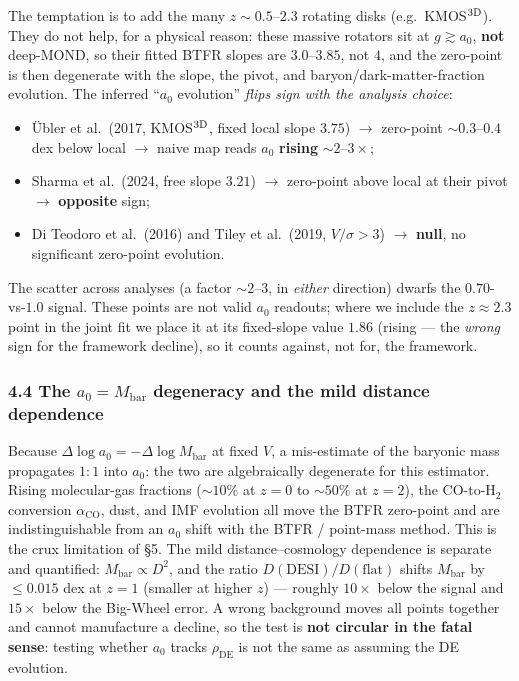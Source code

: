 \documentclass[
]{article}
\providecommand{\tightlist}{%
  \setlength{\itemsep}{0pt}\setlength{\parskip}{0pt}}
\begin{document}
The temptation is to add the many \(z\sim0.5\)--\(2.3\) rotating disks
(e.g.~KMOS\(^{3\rm D}\)). They do not help, for a physical reason: these
massive rotators sit at \(g\gtrsim a_0\), \textbf{not} deep-MOND, so
their fitted BTFR slopes are \(3.0\)--\(3.85\), not \(4\), and the
zero-point is then degenerate with the slope, the pivot, and
baryon/dark-matter-fraction evolution. The inferred ``\(a_0\)
evolution'' \emph{flips sign with the analysis choice}:

\begin{itemize}
\tightlist
\item
  Übler et al.~(2017, KMOS\(^{3\rm D}\), fixed local slope \(3.75\))
  \(\to\) zero-point \(\sim0.3\)--\(0.4\) dex below local \(\to\) naive
  map reads \(a_0\) \textbf{rising} \(\sim2\)--\(3\times\);
\item
  Sharma et al.~(2024, free slope \(3.21\)) \(\to\) zero-point above
  local at their pivot \(\to\) \textbf{opposite} sign;
\item
  Di Teodoro et al.~(2016) and Tiley et al.~(2019, \(V/\sigma>3\))
  \(\to\) \textbf{null}, no significant zero-point evolution.
\end{itemize}

The scatter across analyses (a factor \(\sim2\)--\(3\), in \emph{either}
direction) dwarfs the \(0.70\)-vs-\(1.0\) signal. These points are not
valid \(a_0\) readouts; where we include the \(z\approx2.3\) point in
the joint fit we place it at its fixed-slope value \(1.86\) (rising ---
the \emph{wrong} sign for the framework decline), so it counts against,
not for, the framework.

\subsubsection{\texorpdfstring{4.4 The \(a_0=M_\mathrm{bar}\) degeneracy
and the mild distance
dependence}{4.4 The a\_0=M\_\{\textbackslash rm bar\} degeneracy and the mild distance dependence}}\label{the-a_0m_rm-bar-degeneracy-and-the-mild-distance-dependence}

Because \(\Delta\log a_0=-\Delta\log M_\mathrm{bar}\) at fixed \(V\), a
mis-estimate of the baryonic mass propagates \(1{:}1\) into \(a_0\): the
two are algebraically degenerate for this estimator. Rising
molecular-gas fractions (\(\sim10\%\) at \(z=0\) to \(\sim50\%\) at
\(z=2\)), the CO-to-H\(_2\) conversion \(\alpha_\mathrm{CO}\), dust, and
IMF evolution all move the BTFR zero-point and are indistinguishable
from an \(a_0\) shift with the BTFR / point-mass method. This is the
crux limitation of §5. The mild distance--cosmology dependence is
separate and quantified: \(M_\mathrm{bar}\propto D^2\), and the ratio
\(D(\text{DESI})/D(\text{flat})\) shifts \(M_\mathrm{bar}\) by \(\le0.015\)
dex at \(z=1\) (smaller at higher \(z\)) --- roughly \(10\times\) below
the signal and \(15\times\) below the Big-Wheel error. A wrong
background moves all points together and cannot manufacture a decline,
so the test is \textbf{not circular in the fatal sense}: testing whether
\(a_0\) tracks \(\rho_\mathrm{DE}\) is not the same as assuming the DE
evolution.
\end{document}
